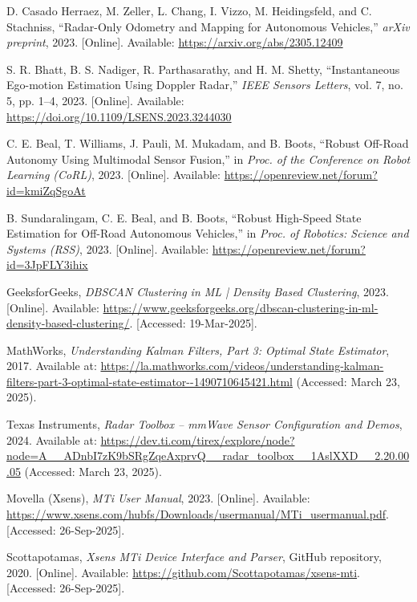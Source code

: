 \begin{thebibliography}{00}
D. Casado Herraez, M. Zeller, L. Chang, I. Vizzo, M. Heidingsfeld, and C. Stachniss, 
``Radar-Only Odometry and Mapping for Autonomous Vehicles,'' 
\textit{arXiv preprint}, 2023. [Online]. Available: \url{https://arxiv.org/abs/2305.12409}

S. R. Bhatt, B. S. Nadiger, R. Parthasarathy, and H. M. Shetty, 
``Instantaneous Ego-motion Estimation Using Doppler Radar,'' 
\textit{IEEE Sensors Letters}, vol. 7, no. 5, pp. 1–4, 2023. [Online]. Available: \url{https://doi.org/10.1109/LSENS.2023.3244030}

C. E. Beal, T. Williams, J. Pauli, M. Mukadam, and B. Boots, 
``Robust Off-Road Autonomy Using Multimodal Sensor Fusion,'' 
in \textit{Proc. of the Conference on Robot Learning (CoRL)}, 2023. [Online]. Available: \url{https://openreview.net/forum?id=kmiZqSgoAt}

B. Sundaralingam, C. E. Beal, and B. Boots, 
``Robust High-Speed State Estimation for Off-Road Autonomous Vehicles,'' 
in \textit{Proc. of Robotics: Science and Systems (RSS)}, 2023. [Online]. Available: \url{https://openreview.net/forum?id=3JpFLY3ihix}


GeeksforGeeks, 
\emph{DBSCAN Clustering in ML | Density Based Clustering}, 
2023. [Online]. Available: \url{https://www.geeksforgeeks.org/dbscan-clustering-in-ml-density-based-clustering/}. [Accessed: 19-Mar-2025].

MathWorks,
\textit{Understanding Kalman Filters, Part 3: Optimal State Estimator},
2017. Available at: \url{https://la.mathworks.com/videos/understanding-kalman-filters-part-3-optimal-state-estimator--1490710645421.html} (Accessed: March 23, 2025).

Texas Instruments, 
\textit{Radar Toolbox – mmWave Sensor Configuration and Demos}, 
2024. Available at: \url{https://dev.ti.com/tirex/explore/node?node=A__ADnbI7zK9bSRgZqeAxprvQ__radar_toolbox__1AslXXD__2.20.00.05} (Accessed: March 23, 2025).

Movella (Xsens),  
\textit{MTi User Manual},  
2023. [Online]. Available: \url{https://www.xsens.com/hubfs/Downloads/usermanual/MTi_usermanual.pdf}. [Accessed: 26-Sep-2025].  

Scottapotamas,  
\textit{Xsens MTi Device Interface and Parser},  
GitHub repository, 2020. [Online]. Available: \url{https://github.com/Scottapotamas/xsens-mti}. [Accessed: 26-Sep-2025].  


\end{thebibliography}
